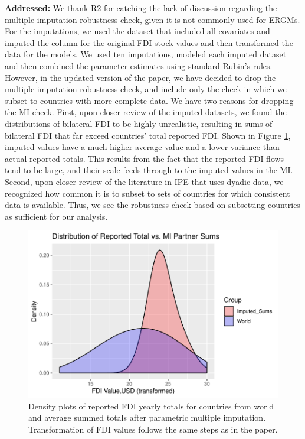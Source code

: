 \documentclass[a4paper,11pt]{texMemo}
\begin{document}
\noindent \textbf{Addressed:} We thank R2 for catching the lack of discussion regarding the multiple imputation robustness check, given it is not commonly used for ERGMs. For the imputations, we used the dataset that included all covariates and imputed the column for the original FDI stock values and then transformed the data for the models. We used ten imputations, modeled each imputed dataset and then combined the parameter estimates using standard Rubin's rules. However, in the updated version of the paper, we have decided to drop the multiple imputation robustness check, and include only the check in which we subset to countries with more complete data. We have two reasons for dropping the MI check. First, upon closer review of the imputed datasets, we found the distributions of bilateral FDI to be highly unrealistic, resulting in sums of bilateral FDI that far exceed countries' total reported FDI. Shown in Figure \ref{fig:MIcheck}, imputed values have a much higher average value and a lower variance than actual reported totals. This results from the fact that the reported FDI flows tend to be large, and their scale feeds through to the imputed values in the MI. Second, upon closer review of the literature in IPE that uses dyadic data, we recognized how common it is to subset to sets of countries for which consistent data is available. Thus, we see the robustness check based on subsetting countries as sufficient for our analysis.\\

\begin{figure}[!h]
\centering
\includegraphics[scale=.75, clip=true, trim=0cm 0cm 0cm .8cm]{check_MIsums_logged.pdf} \vspace{-.5cm}
\caption{\label{fig:MIcheck} Density plots of reported FDI yearly totals for countries from world  and average summed totals after parametric multiple imputation. Transformation of FDI values follows the same steps as in the paper.}
\end{figure}
\end{document}
